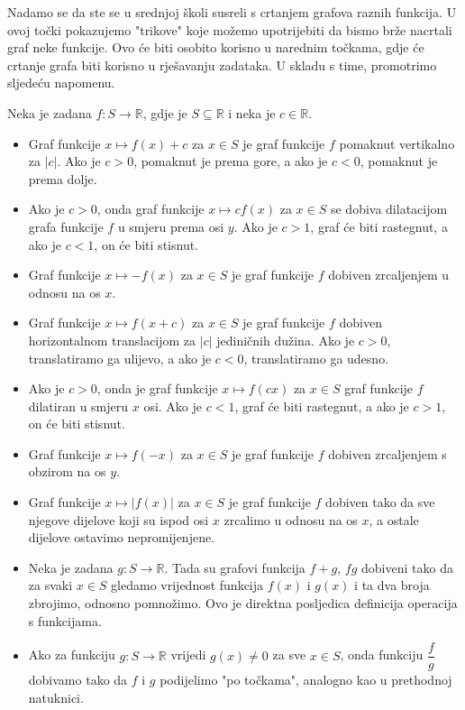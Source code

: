 Nadamo se da ste se u srednjoj školi susreli s crtanjem grafova raznih funkcija. U ovoj točki pokazujemo "trikove" koje možemo upotrijebiti da bismo brže nacrtali graf neke funkcije. Ovo će biti osobito korisno u narednim točkama, gdje će crtanje grafa biti korisno u rješavanju zadataka. U skladu s time, promotrimo sljedeću napomenu.
\begin{remark}
\label{graphrem}
Neka je zadana $f : S\to \mathbb{R}$, gdje je $S\subseteq \mathbb{R}$ i neka je $c\in \mathbb{R}$.
\begin{itemize}
\item Graf funkcije $x\mapsto f(x)+c$ za $x\in S$ je graf funkcije $f$ pomaknut vertikalno za $|c|$. Ako je $c>0$, pomaknut je prema gore, a ako je $c<0$, pomaknut je prema dolje.
\item Ako je $c>0$, onda graf funkcije $x\mapsto cf(x)$ za $x\in S$ se dobiva dilatacijom grafa funkcije $f$ u smjeru prema osi $y$. Ako je $c>1$, graf će biti rastegnut, a ako je $c<1$, on će biti stisnut.
\item Graf funkcije $x\mapsto -f(x)$ za $x\in S$ je graf funkcije $f$ dobiven zrcaljenjem u odnosu na os $x$.
\item Graf funkcije $x\mapsto f(x+c)$ za $x\in S$ je graf funkcije $f$ dobiven horizontalnom translacijom za $|c|$ jediničnih dužina. Ako je $c>0$, translatiramo ga ulijevo, a ako je $c<0$, translatiramo ga udesno.
\item Ako je $c>0$, onda je graf funkcije $x\mapsto f(cx)$ za $x\in S$ graf funkcije $f$ dilatiran u smjeru $x$ osi. Ako je $c<1$, graf će biti rastegnut, a ako je $c>1$, on će biti stisnut.
\item Graf funkcije $x\mapsto f(-x)$ za $x\in S$ je graf funkcije $f$ dobiven zrcaljenjem s obzirom na os $y$.
\item Graf funkcije $x\mapsto |f(x)|$ za $x\in S$ je graf funkcije $f$ dobiven tako da sve njegove dijelove koji su ispod osi $x$ zrcalimo u odnosu na os $x$, a ostale dijelove ostavimo nepromijenjene.
\item Neka je zadana $g : S\to \mathbb{R}$. Tada su grafovi funkcija $f+g$, $fg$ dobiveni tako da za svaki $x\in S$ gledamo vrijednost funkcija $f(x)$ i $g(x)$ i ta dva broja zbrojimo, odnosno pomnožimo. Ovo je direktna posljedica definicija operacija s funkcijama.
\item Ako za funkciju $g : S\to \mathbb{R}$ vrijedi $g(x)\neq 0$ za sve $x\in S$, onda funkciju $\dfrac{f}{g}$ dobivamo tako da $f$ i $g$ podijelimo "po točkama", analogno kao u prethodnoj natuknici.
\end{itemize}
\end{remark}

